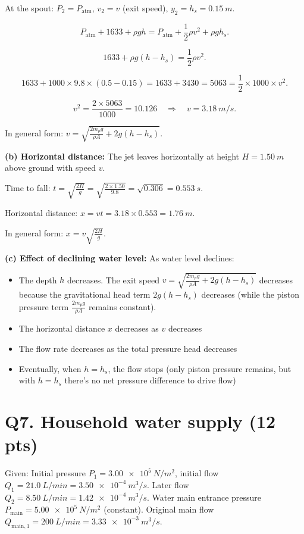 \documentclass[11pt]{article}
\newcommand{\ans}[1]{\boxed{\displaystyle #1}}
\begin{document}
At the spout: $P_2 = P_{\text{atm}}$, $v_2 = v$ (exit speed), $y_2 = h_s = \SI{0.15}{m}$.

\[ P_{\text{atm}} + 1633 + \rho g h = P_{\text{atm}} + \frac{1}{2}\rho v^2 + \rho g h_s. \]

\[ 1633 + \rho g (h - h_s) = \frac{1}{2}\rho v^2. \]

\[ 1633 + 1000 \times 9.8 \times (0.5 - 0.15) = 1633 + 3430 = 5063 = \frac{1}{2} \times 1000 \times v^2. \]

\[ v^2 = \frac{2 \times 5063}{1000} = 10.126 \quad\Rightarrow\quad v = \ans{\SI{3.18}{m/s}}. \]

In general form: $v = \sqrt{\frac{2m_p g}{\rho A} + 2g(h - h_s)}$.

\textbf{(b) Horizontal distance:} The jet leaves horizontally at height $H = \SI{1.50}{m}$ above ground with speed $v$.

Time to fall: $t = \sqrt{\frac{2H}{g}} = \sqrt{\frac{2 \times 1.50}{9.8}} = \sqrt{0.306} = \SI{0.553}{s}$.

Horizontal distance: $x = vt = 3.18 \times 0.553 = \ans{\SI{1.76}{m}}$.

In general form: $x = v \sqrt{\frac{2H}{g}}$.

\textbf{(c) Effect of declining water level:} As water level declines:
\begin{itemize}
  \item The depth $h$ decreases. The exit speed $v = \sqrt{\frac{2m_p g}{\rho A} + 2g(h - h_s)}$ decreases because the gravitational head term $2g(h - h_s)$ decreases (while the piston pressure term $\frac{2m_p g}{\rho A}$ remains constant).
  \item The horizontal distance $x$ decreases as $v$ decreases
  \item The flow rate decreases as the total pressure head decreases
  \item Eventually, when $h = h_s$, the flow stops (only piston pressure remains, but with $h = h_s$ there's no net pressure difference to drive flow)
\end{itemize}

\section*{Q7. Household water supply (12 pts)}
Given: Initial pressure $P_1 = \SI{3.00e5}{N/m^2}$, initial flow $Q_1 = \SI{21.0}{L/min} = \SI{3.50e-4}{m^3/s}$. Later flow $Q_2 = \SI{8.50}{L/min} = \SI{1.42e-4}{m^3/s}$. Water main entrance pressure $P_{\text{main}} = \SI{5.00e5}{N/m^2}$ (constant). Original main flow $Q_{\text{main},1} = \SI{200}{L/min} = \SI{3.33e-3}{m^3/s}$.
\end{document}

